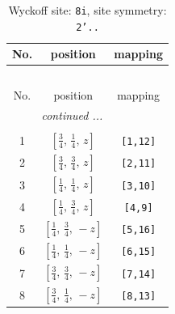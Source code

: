 \documentclass[fleqn,8pt]{jsarticle}
\begin{document}
\renewcommand{\arraystretch}{1.2}
\begin{longtable}{ccc}
\caption{Wyckoff site: {\tt 8i}, site symmetry: {\tt 2'..}}
 \\
 \hline \hline
No. & position & mapping \\ \hline \endfirsthead

\multicolumn{2}{l}{\tablename\ \thetable{}} \\
 \hline \hline
No. & position & mapping \\ \hline \endhead

 \hline \hline
\multicolumn{2}{r}{\footnotesize\it continued ...} \\ \endfoot

 \hline \hline
\multicolumn{2}{r}{} \\ \endlastfoot

1 & $\left[ \frac{3}{4},\, \frac{1}{4},\, z \right]$ & {\tt [1,12]} \\ \hline
2 & $\left[ \frac{3}{4},\, \frac{3}{4},\, z \right]$ & {\tt [2,11]} \\ \hline
3 & $\left[ \frac{1}{4},\, \frac{1}{4},\, z \right]$ & {\tt [3,10]} \\ \hline
4 & $\left[ \frac{1}{4},\, \frac{3}{4},\, z \right]$ & {\tt [4,9]} \\ \hline
5 & $\left[ \frac{1}{4},\, \frac{3}{4},\, - z \right]$ & {\tt [5,16]} \\ \hline
6 & $\left[ \frac{1}{4},\, \frac{1}{4},\, - z \right]$ & {\tt [6,15]} \\ \hline
7 & $\left[ \frac{3}{4},\, \frac{3}{4},\, - z \right]$ & {\tt [7,14]} \\ \hline
8 & $\left[ \frac{3}{4},\, \frac{1}{4},\, - z \right]$ & {\tt [8,13]} \\
\end{longtable}
\renewcommand{\arraystretch}{1.2}
\end{document}
